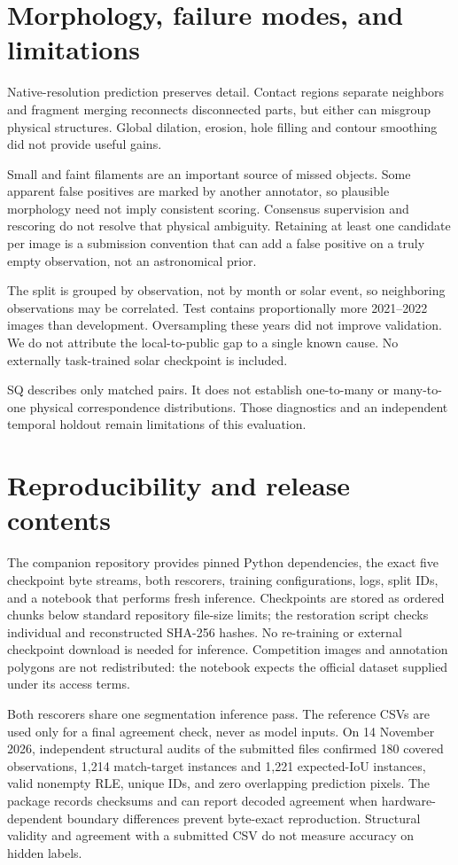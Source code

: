 \documentclass[sigconf,nonacm]{acmart}
\begin{document}
\section{Morphology, failure modes, and limitations}
Native-resolution prediction preserves detail. Contact regions separate
neighbors and fragment merging reconnects disconnected parts, but either
can misgroup physical structures. Global dilation, erosion, hole filling
and contour smoothing did not provide useful gains.

Small and faint filaments are an important source of missed objects.
Some apparent false positives are marked by another annotator, so plausible
morphology need not imply consistent scoring. Consensus supervision and
rescoring do not resolve that physical ambiguity. Retaining at least one
candidate per image is a submission convention that can add a false
positive on a truly empty observation, not an astronomical prior.

The split is grouped by observation, not by month or solar event, so
neighboring observations may be correlated. Test contains proportionally
more 2021--2022 images than development. Oversampling these years did not
improve validation. We do not attribute the local-to-public gap to a single
known cause. No externally task-trained solar checkpoint is included.

SQ describes only matched pairs. It does not establish one-to-many or
many-to-one physical correspondence distributions. Those diagnostics and
an independent temporal holdout remain limitations of this evaluation.

\section{Reproducibility and release contents}
The companion repository provides pinned Python dependencies, the exact
five checkpoint byte streams, both rescorers, training configurations,
logs, split IDs, and a notebook that performs fresh inference. Checkpoints
are stored as ordered chunks below standard repository file-size limits;
the restoration script checks individual and reconstructed SHA-256 hashes.
No re-training or external checkpoint download is needed for inference.
Competition images and annotation polygons are not redistributed: the
notebook expects the official dataset supplied under its access terms.

Both rescorers share one segmentation inference pass. The reference CSVs
are used only for a final agreement check, never as model inputs. On
14 November 2026, independent structural audits of the submitted files
confirmed 180 covered observations, 1,214 match-target instances and 1,221
expected-IoU instances, valid nonempty RLE, unique IDs, and zero overlapping
prediction pixels. The package records checksums and can report decoded
agreement when hardware-dependent boundary differences prevent byte-exact
reproduction. Structural validity and agreement with a submitted CSV do
not measure accuracy on hidden labels.
\end{document}
